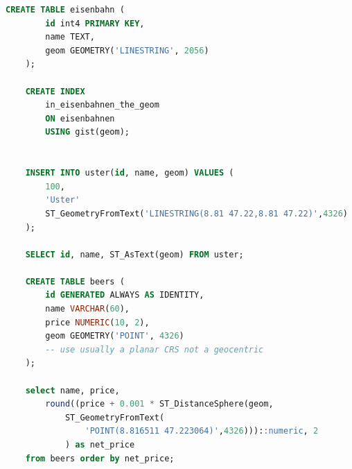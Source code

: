 \documentclass[../Main.tex]{subfiles}
\begin{document}
\begin{lstlisting}[language=SQL]
    CREATE TABLE eisenbahn (
        id int4 PRIMARY KEY, 
        name TEXT,
        geom GEOMETRY('LINESTRING', 2056)
    );

    CREATE INDEX 
        in_eisenbahnen_the_geom
        ON eisenbahnen
        USING gist(geom);


    INSERT INTO uster(id, name, geom) VALUES (
        100,
        'Uster'
        ST_GeometryFromText('LINESTRING(8.81 47.22,8.81 47.22)',4326)  
    );

    SELECT id, name, ST_AsText(geom) FROM uster;

    CREATE TABLE beers (
        id GENERATED ALWAYS AS IDENTITY,
        name VARCHAR(60),
        price NUMERIC(10, 2),
        geom GEOMETRY('POINT', 4326)
        -- use usually a planar CRS not a geocentric
    );

    select name, price,
        round((price + 0.001 * ST_DistanceSphere(geom, 
            ST_GeometryFromText(
                'POINT(8.816511 47.223064)',4326)))::numeric, 2
            ) as net_price
    from beers order by net_price;
\end{lstlisting}
\end{document}

